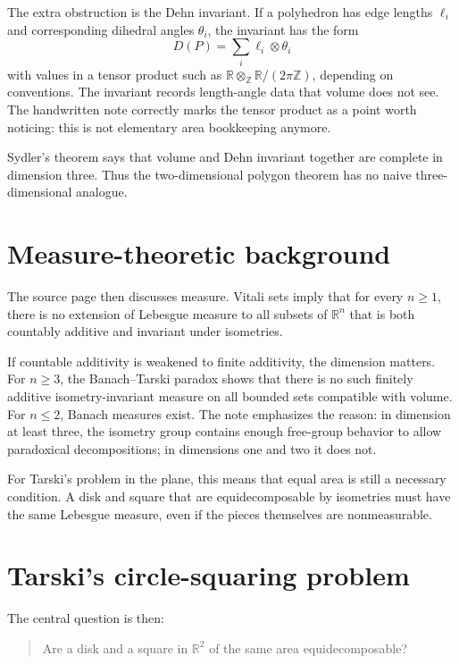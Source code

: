 The extra obstruction is the Dehn invariant.  If a polyhedron has edge lengths $\ell_i$ and corresponding dihedral angles $\theta_i$, the invariant has the form
\[
  D(P)=\sum_i \ell_i\otimes \theta_i
\]
with values in a tensor product such as $\mathbb R\otimes_{\mathbb Z} \mathbb R/(2\pi\mathbb Z)$, depending on conventions.  The invariant records length-angle data that volume does not see.  The handwritten note correctly marks the tensor product as a point worth noticing: this is not elementary area bookkeeping anymore.

Sydler's theorem says that volume and Dehn invariant together are complete in dimension three.  Thus the two-dimensional polygon theorem has no naive three-dimensional analogue.

\section{Measure-theoretic background}

The source page then discusses measure.  Vitali sets imply that for every $n\ge1$, there is no extension of Lebesgue measure to all subsets of $\mathbb R^n$ that is both countably additive and invariant under isometries.

If countable additivity is weakened to finite additivity, the dimension matters.  For $n\ge3$, the Banach--Tarski paradox shows that there is no such finitely additive isometry-invariant measure on all bounded sets compatible with volume.  For $n\le2$, Banach measures exist.  The note emphasizes the reason: in dimension at least three, the isometry group contains enough free-group behavior to allow paradoxical decompositions; in dimensions one and two it does not.

For Tarski's problem in the plane, this means that equal area is still a necessary condition.  A disk and square that are equidecomposable by isometries must have the same Lebesgue measure, even if the pieces themselves are nonmeasurable.

\section{Tarski's circle-squaring problem}

The central question is then:

\begin{quote}
Are a disk and a square in $\mathbb R^2$ of the same area equidecomposable?
\end{quote}

